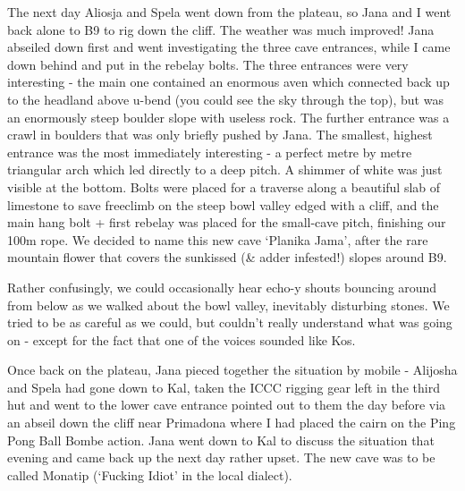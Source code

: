 The next day Aliosja and Spela went down from the plateau, so Jana and I
went back alone to B9 to rig down the cliff. The weather was much
improved! Jana abseiled down first and went investigating the three cave
entrances, while I came down behind and put in the rebelay bolts. The
three entrances were very interesting - the main one contained an
enormous aven which connected back up to the headland above u-bend (you
could see the sky through the top), but was an enormously steep boulder
slope with useless rock. The further entrance was a crawl in boulders
that was only briefly pushed by Jana. The smallest, highest entrance was
the most immediately interesting - a perfect metre by metre triangular
arch which led directly to a deep pitch. A shimmer of white was just
visible at the bottom. Bolts were placed for a traverse along a
beautiful slab of limestone to save freeclimb on the steep bowl valley
edged with a cliff, and the main hang bolt + first rebelay was placed
for the small-cave pitch, finishing our 100m rope. We decided to name
this new cave `Planika Jama', after the rare mountain flower that covers
the sunkissed (\& adder infested!) slopes around B9.

Rather confusingly, we could occasionally hear echo-y shouts bouncing
around from below as we walked about the bowl valley, inevitably
disturbing stones. We tried to be as careful as we could, but couldn't
really understand what was going on - except for the fact that one of
the voices sounded like Kos.

Once back on the plateau, Jana pieced together the situation by mobile -
Alijosha and Spela had gone down to Kal, taken the ICCC rigging gear
left in the third hut and went to the lower cave entrance pointed out to
them the day before via an abseil down the cliff near Primadona where I
had placed the cairn on the Ping Pong Ball Bombe action. Jana went down
to Kal to discuss the situation that evening and came back up the next
day rather upset. The new cave was to be called Monatip (`Fucking Idiot'
in the local dialect).

